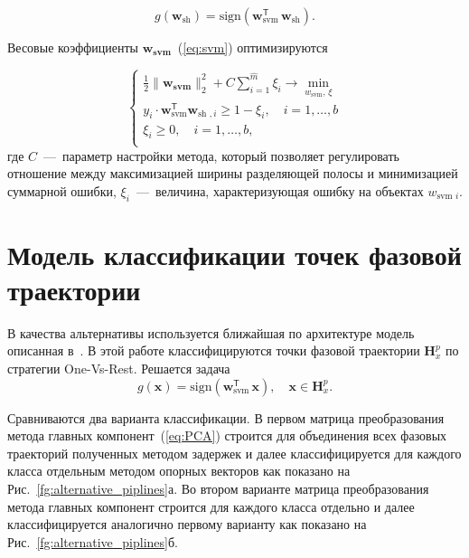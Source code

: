 \documentclass[12pt,twoside]{article}
\begin{document}
\begin{equation}
    g(\mathbf{w}_{\text{sh}}) = \text{sign}(\mathbf{{w}}_{\text{svm}}^{\mathsf{T}}\,\mathbf{w}_{\text{sh}}).
\label{eq:svm}
\end{equation}

Весовые коэффициенты $\mathbf{{w}_{\text{svm}}}$~(\ref{eq:svm}) оптимизируются

\begin{equation}
\begin{cases}
    \frac{1}{2}\|\mathbf{{w}_{\text{svm}}}\|_2^2 + C\sum_{i=1}^{\hat{m}}\xi_i \xrightarrow{} \min_{{w}_{\text{svm}},\,\xi}\\
    y_i \cdot \mathbf{{w}}_{\text{svm}}^{\mathsf{T}}\mathbf{w}_{\text{sh },i} \geq 1 - \xi_i, \quad i = 1,\dots,b\\
    \xi_i \geq 0, \quad i = 1,\dots,b,\\
\end{cases}
\label{eq:svm_solutin}
\end{equation}
где $C$~---~параметр настройки метода, который позволяет регулировать отношение между максимизацией ширины разделяющей полосы и минимизацией суммарной ошибки, $\xi_i$~---~величина, характеризующая ошибку на объектах ${w}_{\text{svm }i}$. 

\section{Модель классификации точек фазовой траектории}
В качества альтернативы используется ближайшая по архитектуре модель описанная в~\cite{Frank_2010}. В этой работе классифицируются точки фазовой траектории $\mathbf{H}_{x}^{p}$ по стратегии One-Vs-Rest. Решается задача
\begin{equation}
    g(\mathbf{x}) = \text{sign}(\mathbf{{w}}_{\text{svm}}^{\mathsf{T}}\,\mathbf{x}),
    \quad
    \mathbf{x} \in \mathbf{H}_{x}^{p}.
\label{eq:alternative_svm}
\end{equation}

Сравниваются два варианта классификации.
В первом матрица преобразования метода главных компонент~(\ref{eq:PCA}) строится для объединения всех фазовых траекторий полученных методом задержек и далее классифицируется для каждого класса отдельным методом опорных векторов как показано на Рис.~\ref{fg:alternative_piplines}а.
Во втором варианте матрица преобразования метода главных компонент строится для каждого класса отдельно и далее классифицируется аналогично первому варианту как показано на Рис.~\ref{fg:alternative_piplines}б.
\end{document}
